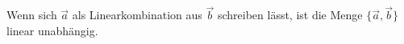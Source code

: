 
Wenn sich $\overrightarrow{a}$ als Linearkombination aus $\overrightarrow{b}$ schreiben lässt, ist die Menge $\{\overrightarrow{a},\overrightarrow{b}\}$ linear unabhängig.

